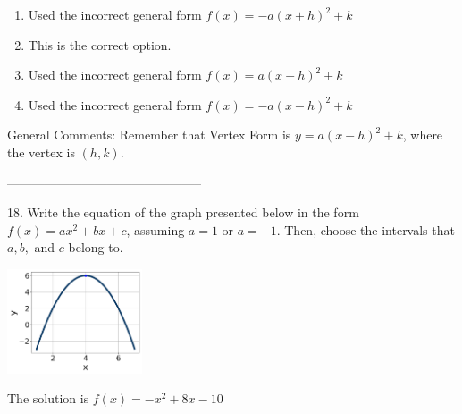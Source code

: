 \documentclass{extbook}[14pt]
\begin{document}
\begin{enumerate}[label=\Alph*.] 
\item Used the incorrect general form $f(x) = -a(x+h)^2 + k$  
\item This is the correct option.  
\item Used the incorrect general form $f(x) = a(x+h)^2 + k$  
\item Used the incorrect general form $f(x) = -a(x-h)^2 + k$  
\end{enumerate} 
 
General Comments: Remember that Vertex Form is $y = a(x-h)^2+k$, where the vertex is $(h, k)$.

-----------------------------------------------

18. Write the equation of the graph presented below in the form $f(x)=ax^2+bx+c$, assuming  $a=1$ or $a=-1$. Then, choose the intervals that $a, b,$ and $c$ belong to.
\begin{center} \includegraphics[width=0.3\textwidth]{../Figures/quadraticGraphToEquationA.png} \end{center} 

The solution is $ f(x) = -x^{2} +8 x -10 $ 
\end{document}
